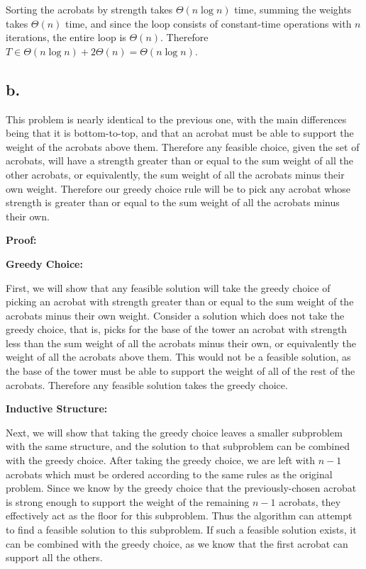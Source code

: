 \documentclass[11pt]{article}
\begin{document}
Sorting the acrobats by strength takes $\Theta(n\log n)$ time, summing the weights takes $\Theta(n)$ time, and since the loop consists of constant-time operations with $n$ iterations, the entire loop is $\Theta(n)$. Therefore $T \in \Theta(n \log n) + 2\Theta (n) = \Theta(n \log n)$.

\subsection*{b.}
This problem is nearly identical to the previous one, with the main differences being that it is bottom-to-top, and that an acrobat must be able to support the weight of the acrobats above them. Therefore any feasible choice, given the set of acrobats, will have a strength greater than or equal to the sum weight of all the other acrobats, or equivalently, the sum weight of all the acrobats minus their own weight. Therefore our greedy choice rule will be to pick any acrobat whose strength is greater than or equal to the sum weight of all the acrobats minus their own. 

\textbf{Proof: }

\textbf{Greedy Choice: }

First, we will show that any feasible solution will take the greedy choice of picking an acrobat with strength greater than or equal to the sum weight of the acrobats minus their own weight. Consider a solution which does not take the greedy choice, that is, picks for the base of the tower an acrobat with strength less than the sum weight of all the acrobats minus their own, or equivalently the weight of all the acrobats above them. This would not be a feasible solution, as the base of the tower must be able to support the weight of all of the rest of the acrobats. Therefore any feasible solution takes the greedy choice.

\textbf{Inductive Structure: }

Next, we will show that taking the greedy choice leaves a smaller subproblem with the same structure, and the solution to that subproblem can be combined with the greedy choice. After taking the greedy choice, we are left with $n-1$ acrobats which must be ordered according to the same rules as the original problem. Since we know by the greedy choice that the previously-chosen acrobat is strong enough to support the weight of the remaining $n-1$ acrobats, they effectively act as the floor for this subproblem. Thus the algorithm can attempt to find a feasible solution to this subproblem. If such a feasible solution exists, it can be combined with the greedy choice, as we know that the first acrobat can support all the others.
\end{document}
